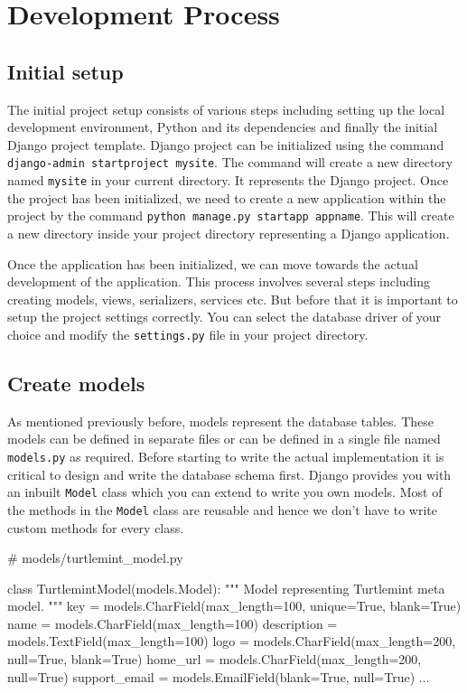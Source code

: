 \chapter{Development Process}

\section{Initial setup}
The initial project setup consists of various steps including setting up the
local development environment, Python and its dependencies and finally the
initial Django project template. Django project can be initialized using the
command \texttt{django-admin startproject mysite}. The command will create a
new directory named \texttt{mysite} in your current directory. It represents
the Django project. Once the project has been initialized, we need to create
a new application within the project by the command
\texttt{python manage.py startapp appname}. This will create a new directory
inside your project directory representing a Django application.

Once the application has been initialized, we can move towards the actual
development of the application. This process involves several steps including
creating models, views, serializers, services etc. But before that it is
important to setup the project settings correctly. You can select the database
driver of your choice and modify the \texttt{settings.py} file in your project
directory.

\section{Create models}
As mentioned previously before, models represent the database tables. These
models can be defined in separate files or can be defined in a single file
named \texttt{models.py} as required. Before starting to write the actual
implementation it is critical to design and write the database schema first.
Django provides you with an inbuilt \texttt{Model} class which you can extend
to write you own models. Most of the methods in the \texttt{Model} class are
reusable and hence we don't have to write custom methods for every class.

\begin{pythoncode}
# models/turtlemint_model.py

class TurtlemintModel(models.Model):
    """
    Model representing Turtlemint meta model.
    """
    key = models.CharField(max_length=100, unique=True, blank=True)
    name = models.CharField(max_length=100)
    description = models.TextField(max_length=100)
    logo = models.CharField(max_length=200, null=True, blank=True)
    home_url = models.CharField(max_length=200, null=True)
    support_email = models.EmailField(blank=True, null=True)
    ...
\end{pythoncode}

